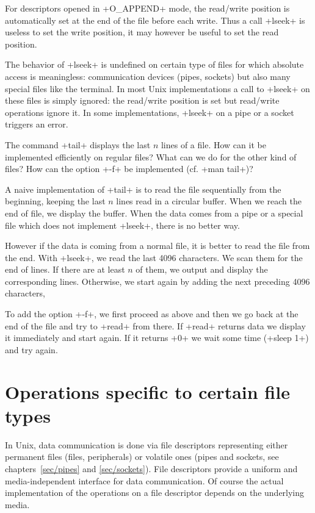 For descriptors opened in \ml+O_APPEND+ mode, the read/write position
is automatically set at the end of the file before each write.  Thus
a call \ml+lseek+ is useless to set the write position, it may however
be useful to set the read position. 

The behavior of \ml+lseek+ is undefined on certain type of files for
which absolute access is meaningless: communication devices (pipes,
sockets) but also many special files like the terminal.
In most Unix implementations a call to \ml+lseek+ on these files is
simply ignored: the read/write position is set but read/write
operations ignore it. In some implementations, \ml+lseek+ on a pipe or
a socket triggers an error.

\begin{exercise}
The command \ml+tail+ displays the last $n$ lines of a file.
How can it be implemented efficiently on regular files? What can we 
do for the other kind of files? How can the option \ml+-f+ be
implemented (cf. \ml+man tail+)?
\enlargethispage{3\baselineskip} %
\end{exercise}
\begin{answer}
A naive implementation of \ml+tail+ is to read the file sequentially
from the beginning, keeping the last $n$ lines read in a circular
buffer. When we reach the end of file, we display the buffer.
When the data comes from a pipe or a special file which
does not implement \ml+lseek+, there is no better way.

However if the data is coming from a normal file, it is better to read
the file from the end. With \ml+lseek+, we read the last 4096
characters. We scan them for the end of lines. If there are at least
$n$ of them, we output and display the corresponding lines.
Otherwise, we start again by adding the next preceding 4096
characters, \etc

To add the option \ml+-f+, we first proceed as above and then we go
back at the end of the file and try to \ml+read+ from there. If
\ml+read+ returns data we display it immediately and start again. If it
returns \ml+0+ we wait some time (\ml+sleep 1+) and try again.
\end{answer}

\section{Operations specific to certain file types}

In Unix, data communication is done via file descriptors representing
either permanent files (files, peripherals) or volatile ones (pipes
and sockets, see chapters~\ref{sec/pipes} and \ref{sec/sockets}). File
descriptors provide a uniform and media-independent interface for data
communication. Of course the actual implementation of the operations
on a file descriptor depends on the underlying media.

